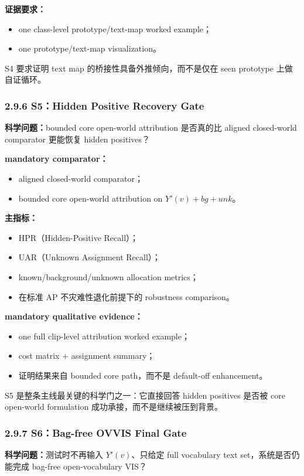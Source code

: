 \documentclass[UTF8]{ctexart}
\begin{document}
\textbf{证据要求：}
\begin{itemize}
\item one class-level prototype/text-map worked example；
\item one prototype/text-map visualization。
\end{itemize}
S4 要求证明 text map 的桥接性具备外推倾向，而不是仅在 seen prototype 上做自证循环。

\subsubsection*{2.9.6 S5：Hidden Positive Recovery Gate}
\textbf{科学问题：}bounded core open-world attribution 是否真的比 aligned closed-world comparator 更能恢复 hidden positives？

\textbf{mandatory comparator：}
\begin{itemize}
\item aligned closed-world comparator；
\item bounded core open-world attribution on $Y'(v)+bg+unk$。
\end{itemize}

\textbf{主指标：}
\begin{itemize}
\item HPR（Hidden-Positive Recall）；
\item UAR（Unknown Assignment Recall）；
\item known/background/unknown allocation metrics；
\item 在标准 AP 不灾难性退化前提下的 robustness comparison。
\end{itemize}

\textbf{mandatory qualitative evidence：}
\begin{itemize}
\item one full clip-level attribution worked example；
\item cost matrix + assignment summary；
\item 证明结果来自 bounded core path，而不是 default-off enhancement。
\end{itemize}
S5 是整条主线最关键的科学门之一：它直接回答 hidden positives 是否被 core open-world formulation 成功承接，而不是继续被压到背景。

\subsubsection*{2.9.7 S6：Bag-free OVVIS Final Gate}
\textbf{科学问题：}测试时不再输入 $Y'(v)$、只给定 full vocabulary text set，系统是否仍能完成 bag-free open-vocabulary VIS？
\end{document}
